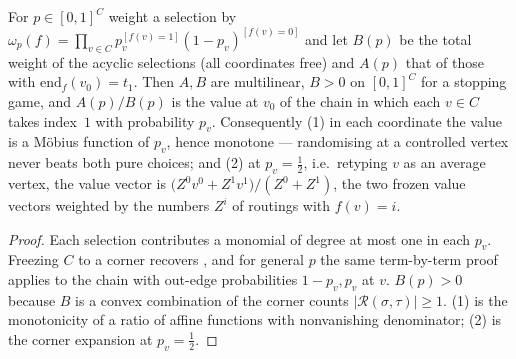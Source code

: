 \begin{proposition}\label{fresh19:prop-mixed}
For $p\in[0,1]^{C}$ weight a selection by
$\omega_p(f)=\prod_{v\in C}p_v^{[f(v)=1]}(1-p_v)^{[f(v)=0]}$ and let $B(p)$ be
the total weight of the acyclic selections (all coordinates free) and $A(p)$
that of those with $\mathrm{end}_f(v_0)=t_1$.  Then $A,B$ are multilinear,
$B>0$ on $[0,1]^{C}$ for a stopping game, and $A(p)/B(p)$ is the value at $v_0$
of the chain in which each $v\in C$ takes index~$1$ with probability $p_v$.
Consequently (1) in each coordinate the value is a M\"obius function of $p_v$,
hence monotone --- randomising at a controlled vertex never beats both pure
choices; and (2) at $p_v=\tfrac12$, i.e.\ retyping $v$ as an average vertex, the
value vector is $\bigl(Z^{0}v^{0}+Z^{1}v^{1}\bigr)/(Z^{0}+Z^{1})$, the two
frozen value vectors weighted by the numbers $Z^{i}$ of routings with $f(v)=i$.
\end{proposition}

\begin{proof}
Each selection contributes a monomial of degree at most one in each $p_v$.
Freezing $C$ to a corner recovers , and for general
$p$ the same term-by-term proof applies to the chain with out-edge
probabilities $1-p_v,p_v$ at $v$.  $B(p)>0$ because $B$ is a convex combination
of the corner counts $|\mathcal R(\sigma,\tau)|\ge1$.  (1) is the monotonicity
of a ratio of affine functions with nonvanishing denominator; (2) is the corner
expansion at $p_v=\tfrac12$.
\end{proof}